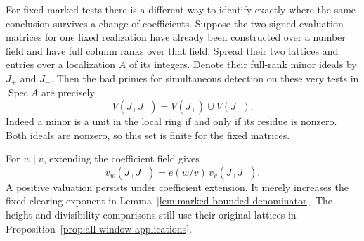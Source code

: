 For fixed marked tests there is a different way to identify exactly
where the same conclusion survives a change of coefficients. Suppose
the two signed evaluation matrices for one fixed realization have
already been constructed over a number field and have full column
ranks over that field. Spread their two lattices and entries over a
localization \(A\) of its integers. Denote their full-rank minor ideals
by \(J_+\) and \(J_-\). Then the bad primes for simultaneous
detection on these very tests in \(\operatorname{Spec}A\) are precisely
\[
          V(J_+J_-)=V(J_+)\cup V(J_-).
\]
Indeed a minor is a unit in the local ring if and only if its residue
is nonzero. Both ideals are nonzero, so this set is finite for the
fixed matrices.

For \(w\mid v\), extending the coefficient field gives
\[
     v_w(J_+J_-)=e(w/v)\,v_v(J_+J_-).
\]
A positive valuation persists under coefficient extension. It merely
increases the fixed clearing exponent in
Lemma~\ref{lem:marked-bounded-denominator}. The height and
divisibility comparisons still use their original lattices in
Proposition~\ref{prop:all-window-applications}.

